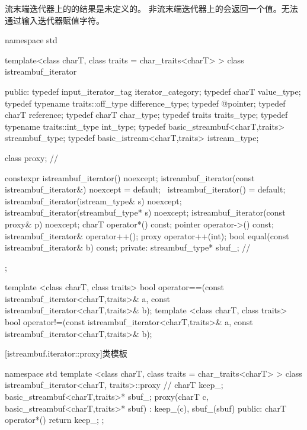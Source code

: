 \pnum
流末端迭代器上的的结果是未定义的。%
非流末端迭代器上的会返回一个值。无法通过输入迭代器赋值字符。

%
\begin{codeblock}
namespace std {
  template<class charT, class traits = char_traits<charT> >
  class istreambuf_iterator {
  public:
    typedef input_iterator_tag            iterator_category;
    typedef charT                         value_type;
    typedef typename traits::off_type     difference_type;
    typedef @\unspecnc@                   pointer;
    typedef charT                         reference;
    typedef charT                         char_type;
    typedef traits                        traits_type;
    typedef typename traits::int_type     int_type;
    typedef basic_streambuf<charT,traits> streambuf_type;
    typedef basic_istream<charT,traits>   istream_type;

    class proxy;                          // \expos

    constexpr istreambuf_iterator() noexcept;
    istreambuf_iterator(const istreambuf_iterator&) noexcept = default;
    ~istreambuf_iterator() = default;
    istreambuf_iterator(istream_type& s) noexcept;
    istreambuf_iterator(streambuf_type* s) noexcept;
    istreambuf_iterator(const proxy& p) noexcept;
    charT operator*() const;
    pointer operator->() const;
    istreambuf_iterator& operator++();
    proxy operator++(int);
    bool equal(const istreambuf_iterator& b) const;
  private:
    streambuf_type* sbuf_;                // \expos
  };

  template <class charT, class traits>
    bool operator==(const istreambuf_iterator<charT,traits>& a,
            const istreambuf_iterator<charT,traits>& b);
  template <class charT, class traits>
    bool operator!=(const istreambuf_iterator<charT,traits>& a,
            const istreambuf_iterator<charT,traits>& b);
}
\end{codeblock}

[istreambuf.iterator::proxy]{类模板}

%
\begin{codeblock}
namespace std {
  template <class charT, class traits = char_traits<charT> >
  class istreambuf_iterator<charT, traits>::proxy { // \expos
    charT keep_;
    basic_streambuf<charT,traits>* sbuf_;
    proxy(charT c, basic_streambuf<charT,traits>* sbuf)
      : keep_(c), sbuf_(sbuf) { }
  public:
    charT operator*() { return keep_; }
  };
}
\end{codeblock}

